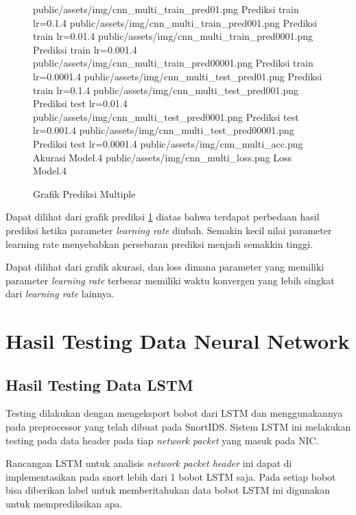 \documentclass[./skripsi.tex]{subfiles}
\begin{document}
\begin{figure}[H]
\centering
\buatsubgrafik 
{public/assets/img/cnn_multi_train_pred01.png}
{Prediksi train lr=0.1}{.4}
\buatsubgrafik 
{public/assets/img/cnn_multi_train_pred001.png}
{Prediksi train lr=0.01}{.4}
\buatsubgrafik 
{public/assets/img/cnn_multi_train_pred0001.png}
{Prediksi train lr=0.001}{.4}
\buatsubgrafik 
{public/assets/img/cnn_multi_train_pred00001.png}
{Prediksi train lr=0.0001}{.4}
\buatsubgrafik 
{public/assets/img/cnn_multi_test_pred01.png}
{Prediksi train lr=0.1}{.4}
\buatsubgrafik 
{public/assets/img/cnn_multi_test_pred001.png}
{Prediksi test lr=0.01}{.4}
\buatsubgrafik 
{public/assets/img/cnn_multi_test_pred0001.png}
{Prediksi test lr=0.001}{.4}
\buatsubgrafik 
{public/assets/img/cnn_multi_test_pred00001.png}
{Prediksi test lr=0.0001}{.4}
\buatsubgrafik 
{public/assets/img/cnn_multi_acc.png}
{Akurasi Model}{.4}
\buatsubgrafik 
{public/assets/img/cnn_multi_loss.png}
{Loss Model}{.4}
\caption{Grafik Prediksi Multiple}
\label{fig:cnn_multi_pred}
\end{figure}
\par Dapat dilihat dari grafik prediksi \ref{fig:cnn_multi_pred} diatas bahwa terdapat perbedaan hasil prediksi ketika parameter \textit{learning rate} diubah. Semakin kecil nilai parameter learning rate menyebabkan persebaran prediksi menjadi semakkin tinggi.
\par Dapat dilihat dari grafik akurasi, dan loss dimana parameter yang memiliki parameter \textit{learning rate} terbesar memiliki waktu konvergen yang lebih singkat dari \textit{learning rate} lainnya.

\section{Hasil Testing Data Neural Network}
\subsection{Hasil Testing Data LSTM}
\par Testing dilakukan dengan mengeksport bobot dari LSTM dan menggunakannya pada preprocessor yang telah dibuat pada SnortIDS.
Sistem LSTM ini melakukan testing pada data header pada tiap \textit{network packet} yang masuk pada NIC.
\par Rancangan LSTM untuk analisis \textit{network packet header} ini dapat di implementasikan pada snort lebih dari 1 bobot LSTM saja. Pada setiap bobot bisa diberikan label untuk memberitahukan data bobot LSTM ini digunakan untuk memprediksikan apa.
\end{document}
